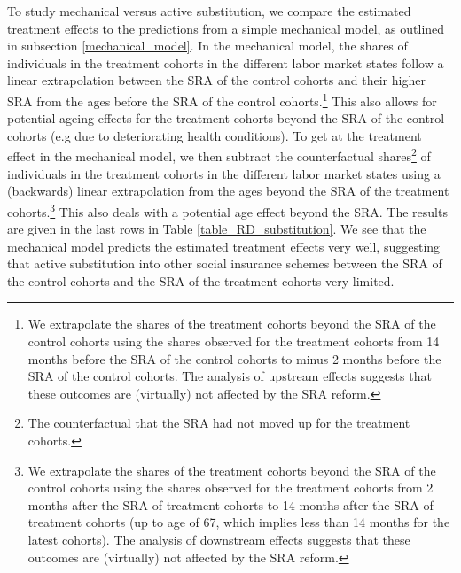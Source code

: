 \documentclass[12pt,a4paper]{article}
\begin{document}
To study mechanical versus active substitution, we compare the estimated treatment effects to the predictions from a simple mechanical model, as outlined in subsection \ref{mechanical_model}. In the mechanical model, the shares of individuals in the treatment cohorts in the different labor market states follow a linear extrapolation between the SRA of the control cohorts and their higher SRA from the ages before the SRA of the control cohorts.\footnote{We extrapolate the shares of the treatment cohorts beyond the SRA of the control cohorts using the shares observed for the treatment cohorts from 14 months before the SRA of the control cohorts to minus 2 months before the SRA of the control cohorts. The analysis of upstream effects suggests that these outcomes are (virtually) not affected by the SRA reform.} This also allows for potential ageing effects for the treatment cohorts beyond the SRA of the control cohorts (e.g due to deteriorating health conditions). To get at the treatment effect in the mechanical model, we then subtract the counterfactual shares\footnote{The counterfactual that the SRA had not moved up for the treatment cohorts.} of individuals in the treatment cohorts in the different labor market states using a (backwards) linear extrapolation from the ages beyond the SRA of the treatment cohorts.\footnote{We extrapolate the shares of the treatment cohorts beyond the SRA of the control cohorts using the shares observed for the treatment cohorts from 2 months after the SRA of treatment cohorts to 14 months after the SRA of treatment cohorts (up to age of 67, which implies less than 14 months for the latest cohorts). The analysis of downstream effects suggests that these outcomes are (virtually) not affected by the SRA reform.} This also deals with a potential age effect beyond the SRA. The results are given in the last rows in Table \ref{table_RD_substitution}. We see that the mechanical model predicts the estimated treatment effects very well, suggesting that active substitution into other social insurance schemes between the SRA of the control cohorts and the SRA of the treatment cohorts very limited.

%		
\end{document}

